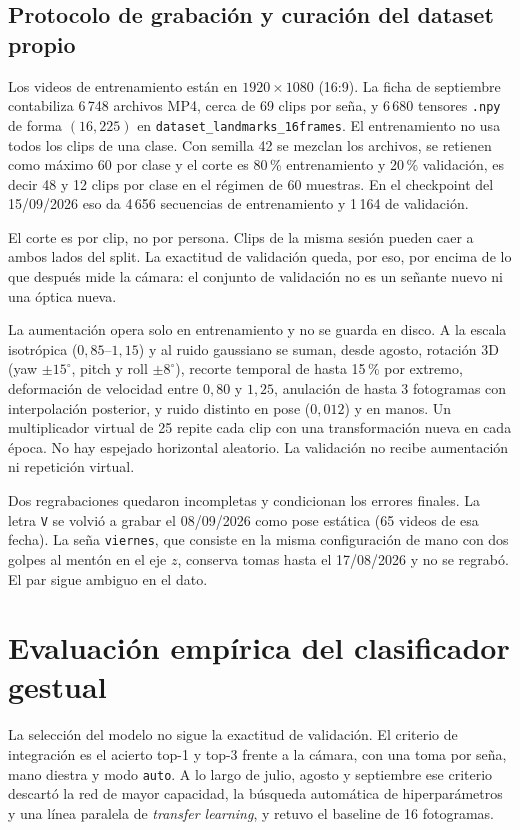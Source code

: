 \subsection{Protocolo de grabación y curación del dataset propio}

Los videos de entrenamiento están en $1920 \times 1080$ (16:9). La ficha de septiembre contabiliza 6\,748 archivos MP4, cerca de 69 clips por seña, y 6\,680 tensores \texttt{.npy} de forma $(16, 225)$ en \texttt{dataset\_landmarks\_16frames}. El entrenamiento no usa todos los clips de una clase. Con semilla 42 se mezclan los archivos, se retienen como máximo 60 por clase y el corte es 80\,\% entrenamiento y 20\,\% validación, es decir 48 y 12 clips por clase en el régimen de 60 muestras. En el checkpoint del 15/09/2026 eso da 4\,656 secuencias de entrenamiento y 1\,164 de validación.

El corte es por clip, no por persona. Clips de la misma sesión pueden caer a ambos lados del split. La exactitud de validación queda, por eso, por encima de lo que después mide la cámara: el conjunto de validación no es un señante nuevo ni una óptica nueva.

La aumentación opera solo en entrenamiento y no se guarda en disco. A la escala isotrópica ($0{,}85$--$1{,}15$) y al ruido gaussiano se suman, desde agosto, rotación 3D (yaw $\pm 15^{\circ}$, pitch y roll $\pm 8^{\circ}$), recorte temporal de hasta 15\,\% por extremo, deformación de velocidad entre $0{,}80$ y $1{,}25$, anulación de hasta 3 fotogramas con interpolación posterior, y ruido distinto en pose ($0{,}012$) y en manos. Un multiplicador virtual de 25 repite cada clip con una transformación nueva en cada época. No hay espejado horizontal aleatorio. La validación no recibe aumentación ni repetición virtual.

Dos regrabaciones quedaron incompletas y condicionan los errores finales. La letra \texttt{V} se volvió a grabar el 08/09/2026 como pose estática (65 videos de esa fecha). La seña \texttt{viernes}, que consiste en la misma configuración de mano con dos golpes al mentón en el eje $z$, conserva tomas hasta el 17/08/2026 y no se regrabó. El par sigue ambiguo en el dato.

\section{Evaluación empírica del clasificador gestual}

La selección del modelo no sigue la exactitud de validación. El criterio de integración es el acierto top-1 y top-3 frente a la cámara, con una toma por seña, mano diestra y modo \texttt{auto}. A lo largo de julio, agosto y septiembre ese criterio descartó la red de mayor capacidad, la búsqueda automática de hiperparámetros y una línea paralela de \textit{transfer learning}, y retuvo el baseline de 16 fotogramas.

